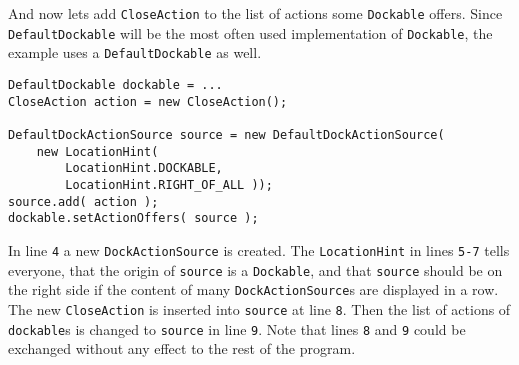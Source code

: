\documentclass[a4paper,10pt]{article}
\newcommand{\src}[1]{\lstinline[basicstyle=\normalsize\ttfamily,keywordstyle=\normalsize\ttfamily,identifierstyle=\normalsize\ttfamily]|#1|}
\begin{document}
And now lets add \src{CloseAction} to the list of actions some \src{Dockable} offers. Since \src{DefaultDockable} will be the most often used implementation of \src{Dockable}, the example uses a \src{DefaultDockable} as well.
\begin{lstlisting}
DefaultDockable dockable = ...
CloseAction action = new CloseAction();

DefaultDockActionSource source = new DefaultDockActionSource(
	new LocationHint(
		LocationHint.DOCKABLE, 
		LocationHint.RIGHT_OF_ALL ));
source.add( action );
dockable.setActionOffers( source );
\end{lstlisting}
In line \src{4} a new \src{DockActionSource} is created. The \src{LocationHint} in lines \src{5-7} tells everyone, that the origin of \src{source} is a \src{Dockable}, and that \src{source} should be on the right side if the content of many \src{DockActionSource}s are displayed in a row. The new \src{CloseAction} is inserted into \src{source} at line \src{8}. Then the list of actions of \src{dockable}s is changed to \src{source} in line \src{9}. Note that lines \src{8} and \src{9} could be exchanged without any effect to the rest of the program.
\end{document}
